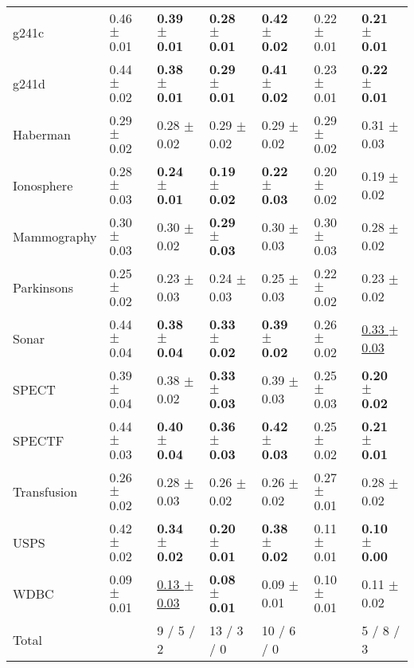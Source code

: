 \documentclass[sts,preprint]{imsart-custom}
\begin{document}
\begin{table*}[t]
\begin{tabular}{|l|llll|ll|}
  g241c & 0.46 $\pm$ 0.01 & \textbf{0.39 $\pm$ 0.01} & \textbf{0.28 $\pm$ 0.01} & \textbf{0.42 $\pm$ 0.02} & 0.22 $\pm$ 0.01 & \textbf{0.21 $\pm$ 0.01} \\ 
  g241d & 0.44 $\pm$ 0.02 & \textbf{0.38 $\pm$ 0.01} & \textbf{0.29 $\pm$ 0.01} & \textbf{0.41 $\pm$ 0.02} & 0.23 $\pm$ 0.01 & \textbf{0.22 $\pm$ 0.01} \\ 
  Haberman & 0.29 $\pm$ 0.02 & 0.28 $\pm$ 0.02 & 0.29 $\pm$ 0.02 & 0.29 $\pm$ 0.02 & 0.29 $\pm$ 0.02 & 0.31 $\pm$ 0.03 \\ 
  Ionosphere & 0.28 $\pm$ 0.03 & \textbf{0.24 $\pm$ 0.01} & \textbf{0.19 $\pm$ 0.02} & \textbf{0.22 $\pm$ 0.03} & 0.20 $\pm$ 0.02 & 0.19 $\pm$ 0.02 \\ 
  Mammography & 0.30 $\pm$ 0.03 & 0.30 $\pm$ 0.02 & \textbf{0.29 $\pm$ 0.03} & 0.30 $\pm$ 0.03 & 0.30 $\pm$ 0.03 & 0.28 $\pm$ 0.02 \\ 
  Parkinsons & 0.25 $\pm$ 0.02 & 0.23 $\pm$ 0.03 & 0.24 $\pm$ 0.03 & 0.25 $\pm$ 0.03 & 0.22 $\pm$ 0.02 & 0.23 $\pm$ 0.02 \\ 
  Sonar & 0.44 $\pm$ 0.04 & \textbf{0.38 $\pm$ 0.04} & \textbf{0.33 $\pm$ 0.02} & \textbf{0.39 $\pm$ 0.02} & 0.26 $\pm$ 0.02 & \underline{0.33 $\pm$ 0.03} \\ 
  SPECT & 0.39 $\pm$ 0.04 & 0.38 $\pm$ 0.02 & \textbf{0.33 $\pm$ 0.03} & 0.39 $\pm$ 0.03 & 0.25 $\pm$ 0.03 & \textbf{0.20 $\pm$ 0.02} \\ 
  SPECTF & 0.44 $\pm$ 0.03 & \textbf{0.40 $\pm$ 0.04} & \textbf{0.36 $\pm$ 0.03} & \textbf{0.42 $\pm$ 0.03} & 0.25 $\pm$ 0.02 & \textbf{0.21 $\pm$ 0.01} \\ 
  Transfusion & 0.26 $\pm$ 0.02 & 0.28 $\pm$ 0.03 & 0.26 $\pm$ 0.02 & 0.26 $\pm$ 0.02 & 0.27 $\pm$ 0.01 & 0.28 $\pm$ 0.02 \\ 
  USPS & 0.42 $\pm$ 0.02 & \textbf{0.34 $\pm$ 0.02} & \textbf{0.20 $\pm$ 0.01} & \textbf{0.38 $\pm$ 0.02} & 0.11 $\pm$ 0.01 & \textbf{0.10 $\pm$ 0.00} \\ 
  WDBC & 0.09 $\pm$ 0.01 & \underline{0.13 $\pm$ 0.03} & \textbf{0.08 $\pm$ 0.01} & 0.09 $\pm$ 0.01 & 0.10 $\pm$ 0.01 & 0.11 $\pm$ 0.02 \\ 
   \hline
Total &  & 9 / 5 / 2 & 13 / 3 / 0 & 10 / 6 / 0 &  & 5 / 8 / 3 \\ 
   \hline
\end{tabular}



\end{table*}
\end{document}
